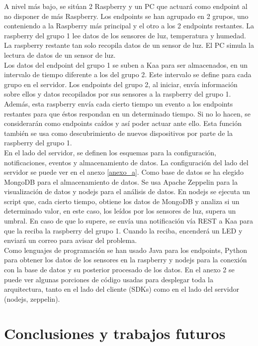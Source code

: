 \documentclass[12pt, twoside]{book}
\begin{document}
A nivel más bajo, se sitúan 2 Raspberry y un PC que actuará como endpoint al no disponer de más Raspberry. Los endpoints se han agrupado en 2 grupos, uno conteniendo a la Raspberry más principal y el otro a los 2 endpoints restantes. La raspberry del grupo 1 lee datos de los sensores de luz, temperatura y humedad. La raspberry restante tan solo recopila datos de un sensor de luz. El PC simula la lectura de datos de un sensor de luz.\\Los datos del endpoint del grupo 1 se suben a Kaa para ser almacenados, en un intervalo de tiempo diferente a los del grupo 2. Este intervalo se define para cada grupo en el servidor. Los endpoints del grupo 2, al iniciar, envía información sobre ellos y datos recopilados por sus sensores a la raspberry del grupo 1. Además, esta raspberry envía cada cierto tiempo un evento a los endpoints restantes para que éstos respondan en un determinado tiempo. Si no lo hacen, se considerarán como endpoints caídos y así poder actuar ante ello. Esta función también se usa como descubrimiento de nuevos dispositivos por parte de la raspberry del grupo 1.\\

En el lado del servidor, se definen los esquemas para la configuración, notificaciones, eventos y almacenamiento de datos. La configuración del lado del servidor se puede ver en el anexo \ref{anexo_a}. Como base de datos se ha elegido MongoDB para el almacenamiento de datos. Se usa Apache Zeppelin para la visualización de datos y nodejs para el análisis de datos. En nodejs se ejecuta un script que, cada cierto tiempo, obtiene los datos de MongoDB y analiza si un determinado valor, en este caso, los leídos por los sensores de luz, supera un umbral. En caso de que lo supere, se envía una notificación vía REST a Kaa para que la reciba la raspberry del grupo 1. Cuando la reciba, encenderá un LED y enviará un correo para avisar del problema. \\
Como lenguajes de programación se han usado Java para los endpoints, Python para obtener los datos de los sensores en la raspberry y nodejs para la conexión con la base de datos y su posterior procesado de los datos. En el anexo 2 se puede ver algunas porciones de código usadas para desplegar toda la arquitectura, tanto en el lado del cliente (SDKs) como en el lado del servidor (nodejs, zeppelin). 



\chapter{Conclusiones y trabajos futuros}
\end{document}
